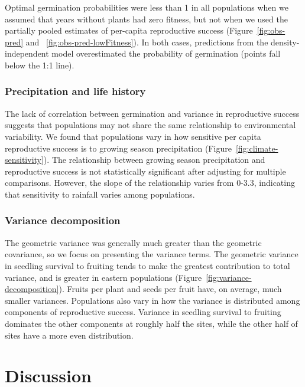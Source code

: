 \documentclass[12pt, oneside, titlepage]{article}   	%
\begin{document}
Optimal germination probabilities were less than 1 in all populations when we assumed that years without plants had zero fitness, but not when we used the partially pooled estimates of per-capita reproductive success (Figure~\ref{fig:obs-pred} and ~\ref{fig:obs-pred-lowFitness}). In both cases, predictions from the density-independent model overestimated the probability of germination (points fall below the 1:1 line).

\subsubsection*{Precipitation and life history}

The lack of correlation between germination and variance in reproductive success suggests that populations may not share the same relationship to environmental variability. We found that populations vary in how sensitive per capita reproductive success is to growing season precipitation (Figure~\ref{fig:climate-sensitivity}). The relationship between growing season precipitation and reproductive success is not statistically significant after adjusting for multiple comparisons. However, the slope of the relationship varies from 0-3.3, indicating that sensitivity to rainfall varies among populations.

\subsubsection*{Variance decomposition}

The geometric variance was generally much greater than the geometric covariance, so we focus on presenting the variance terms. The geometric variance in seedling survival to fruiting tends to make the greatest contribution to total variance, and is greater in eastern populations (Figure~\ref{fig:variance-decomposition}). Fruits per plant and seeds per fruit have, on average, much smaller variances. Populations also vary in how the variance is distributed among components of reproductive success. Variance in seedling survival to fruiting dominates the other components at roughly half the sites, while the other half of sites have a more even distribution. 

\section*{Discussion}
\end{document}
